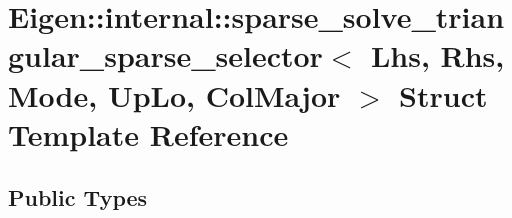 \hypertarget{struct_eigen_1_1internal_1_1sparse__solve__triangular__sparse__selector_3_01_lhs_00_01_rhs_00_0103d70089ab1c1a5e4529163773532981}{}\section{Eigen\+:\+:internal\+:\+:sparse\+\_\+solve\+\_\+triangular\+\_\+sparse\+\_\+selector$<$ Lhs, Rhs, Mode, Up\+Lo, Col\+Major $>$ Struct Template Reference}
\label{struct_eigen_1_1internal_1_1sparse__solve__triangular__sparse__selector_3_01_lhs_00_01_rhs_00_0103d70089ab1c1a5e4529163773532981}
\subsection*{Public Types}
